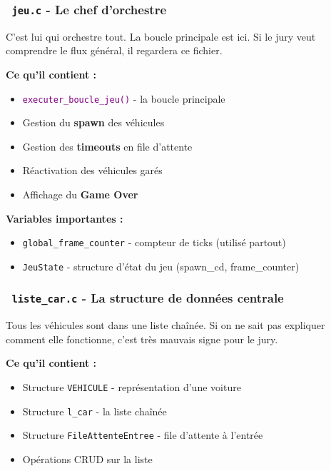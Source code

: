 \documentclass[11pt,a4paper]{article}
\newcommand{\fichier}[1]{\texttt{\textcolor{primary}{\faIcon{file-code} #1}}}
\newcommand{\fonction}[1]{\texttt{\textcolor{purple}{#1()}}}
\newcommand{\variable}[1]{\texttt{\textcolor{success}{#1}}}
\newcommand{\concept}[1]{\textcolor{primary}{\textbf{#1}}}
\begin{document}
\subsubsection{\fichier{jeu.c} - Le chef d'orchestre}

\begin{keybox}
C'est lui qui orchestre tout. La boucle principale est ici. Si le jury veut comprendre le flux général, il regardera ce fichier.
\end{keybox}

\textbf{Ce qu'il contient :}
\begin{itemize}[noitemsep]
    \item \fonction{executer\_boucle\_jeu} - la boucle principale
    \item Gestion du \concept{spawn} des véhicules
    \item Gestion des \concept{timeouts} en file d'attente
    \item Réactivation des véhicules garés
    \item Affichage du \concept{Game Over}
\end{itemize}

\textbf{Variables importantes :}
\begin{itemize}[noitemsep]
    \item \variable{global\_frame\_counter} - compteur de ticks (utilisé partout)
    \item \variable{JeuState} - structure d'état du jeu (spawn\_cd, frame\_counter)
\end{itemize}

\subsubsection{\fichier{liste\_car.c} - La structure de données centrale}

\begin{keybox}
Tous les véhicules sont dans une liste chaînée. Si on ne sait pas expliquer comment elle fonctionne, c'est très mauvais signe pour le jury.
\end{keybox}

\textbf{Ce qu'il contient :}
\begin{itemize}[noitemsep]
    \item Structure \variable{VEHICULE} - représentation d'une voiture
    \item Structure \variable{l\_car} - la liste chaînée
    \item Structure \variable{FileAttenteEntree} - file d'attente à l'entrée
    \item Opérations CRUD sur la liste
\end{itemize}
\end{document}
